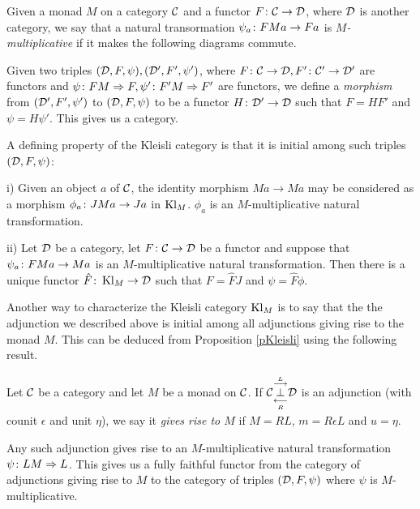 \documentclass{article}
\begin{document}
Given a monad $M$ on a category $\C$ and a functor $F\from \C \to \D$, where $\D$ is another category, we say that a natural transormation $\psi_a \from FMa \to Fa$ is \emph{$M$-multiplicative} if it makes the following diagrams commute.

Given two triples $(\D, F,\psi), (\D', F',\psi')$, where $F\from \C \to \D, F'\from \C'\to\D'$ are functors and $\psi\from FM\Rightarrow F, \psi'\from F'M\Rightarrow F'$ are functors, we define a \emph{morphism} from $(\D', F',\psi')$ to $(\D, F, \psi)$ to be a functor $H\from \D' \to \D$ such that $F=HF'$ and $\psi=H\psi'$.  
This gives us a category.

A defining property of the Kleisli category is that it is initial among such triples $(\D,F,\psi)$:

\begin{proposition}
  i) Given an object $a$ of $\C$, the identity morphism $Ma \to Ma$ may be considered as a morphism $\phi_a \from JMa \to Ja$ in $\Kl_M$.  
  $\phi_a$ is an $M$-multiplicative natural transformation.

  ii) Let $\D$ be a category, let $F\from \C \to \D$ be a functor and suppose that $\psi_a\from FMa \to Ma$ is an $M$-multiplicative natural transformation.
  Then there is a unique functor $\hat{F}\from \Kl_M \to \D$ such that $F=\hat{F}J$ and $\psi = \hat{F}\phi$.
  \label{pKleisli}
\end{proposition}

Another way to characterize the Kleisli category $\Kl_M$ is to say that the the adjunction we described above is initial among all adjunctions giving rise to the monad $M$.  
This can be deduced from Proposition \ref{pKleisli} using the following result.

\begin{lemma}
  Let $\C$ be a category and let $M$ be a monad on $\C$.  
  If $\adjunction{\C}{L}{R}{\D}$ is an adjunction (with counit $\epsilon$ and unit $\eta$), we say it \emph{gives rise to $M$} if $M=RL$, $m=R\epsilon L$ and $u=\eta$.

  Any such adjunction gives rise to an $M$-multiplicative natural transformation $\psi\from LM \Rightarrow L$.  
  This gives us a fully faithful functor from the category of adjunctions giving rise to $M$ to the category of triples $(\D,F,\psi)$ where $\psi$ is $M$-multiplicative.
\end{lemma}
\end{document}
